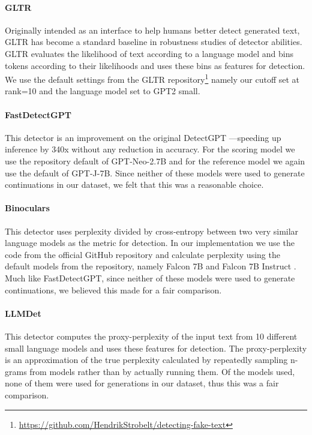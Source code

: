 \documentclass[11pt]{article}
\begin{document}
\paragraph{GLTR} \cite{gehrmann-etal-2019-gltr} Originally intended as an interface to help humans better detect generated text, GLTR has become a standard baseline in robustness studies of detector abilities. GLTR evaluates the likelihood of text according to a language model and bins tokens according to their likelihoods and uses these bins as features for detection. We use the default settings from the GLTR repository\footnote{\url{https://github.com/HendrikStrobelt/detecting-fake-text}} namely our cutoff set at rank=10 and the language model set to GPT2 small.

\paragraph{FastDetectGPT} \cite{bao2023fastdetectgpt} This detector is an improvement on the original DetectGPT \cite{mitchell-etal-2023-detectgpt}---speeding up inference by 340x without any reduction in accuracy. For the scoring model we use the repository default of GPT-Neo-2.7B and for the reference model we again use the default of GPT-J-7B. Since neither of these models were used to generate continuations in our dataset, we felt that this was a reasonable choice.

\paragraph{Binoculars} \cite{hans2024spotting} This detector uses perplexity divided by cross-entropy between two very similar language models as the metric for detection. In our implementation we use the code from the official GitHub repository and calculate perplexity using the default models from the repository, namely Falcon 7B and Falcon 7B Instruct \cite{almazrouei2023falcon}. Much like FastDetectGPT, since neither of these models were used to generate continuations, we believed this made for a fair comparison.

\paragraph{LLMDet} \cite{wu-etal-2023-llmdet} This detector computes the proxy-perplexity of the input text from 10 different small language models and uses these features for detection. The proxy-perplexity is an approximation of the true perplexity calculated by repeatedly sampling n-grams from models rather than by actually running them. Of the models used, none of them were used for generations in our dataset, thus this was a fair comparison.
\end{document}
